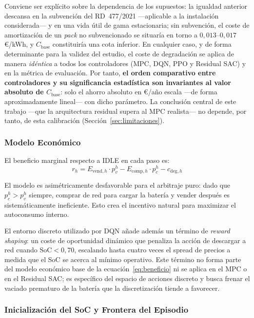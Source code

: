 \documentclass[12pt, a4paper, twoside]{report}
\begin{document}
Conviene ser explícito sobre la dependencia de los supuestos: la igualdad anterior
descansa en la subvención del RD~477/2021 —aplicable a la instalación
considerada— y en una vida útil de gama estacionaria; sin subvención, el coste de
amortización de un \emph{pack} no subvencionado se situaría en torno a
$0{,}013\text{--}0{,}017$\,€/kWh, y $C_{\text{base}}$ constituiría una cota
inferior. En cualquier caso, y de forma determinante para la validez del estudio,
el coste de degradación se aplica de manera \emph{idéntica} a todos los
controladores (MPC, DQN, PPO y Residual SAC) y en la métrica de evaluación. Por
tanto, \textbf{el orden comparativo entre controladores y su significancia
estadística son invariantes al valor absoluto de $C_{\text{base}}$}: solo el ahorro
absoluto en €/año escala —de forma aproximadamente lineal— con dicho parámetro. La
conclusión central de este trabajo —que la arquitectura residual supera al MPC
realista— no depende, por tanto, de esta calibración
(Sección~\ref{sec:limitaciones}).

\subsubsection{Modelo Económico}

El beneficio marginal respecto a IDLE en cada paso es:
\begin{equation}
  r_h = E_{\text{vend},h} \cdot p_v^h - E_{\text{comp},h} \cdot p_c^h
        - c_{\text{deg},h}
  \label{eq:beneficio}
\end{equation}

El modelo es asimétricamente desfavorable para el arbitraje puro: dado que
$p_c^h > p_v^h$ siempre, comprar de red para cargar la batería y vender
después es sistemáticamente ineficiente. Esto crea el incentivo natural para
maximizar el autoconsumo interno.

El entorno discreto utilizado por DQN añade además un término de
\textit{reward shaping}: un coste de oportunidad dinámico que penaliza la
acción de descargar a red cuando $\text{SoC} < 0{,}70$, escalando hasta cuatro
veces el spread de precios a medida que el SoC se acerca al mínimo operativo.
Este término no forma parte del modelo económico base de la
ecuación~\eqref{eq:beneficio} ni se aplica en el MPC o en el Residual SAC; es
específico del espacio de acciones discreto y busca frenar el vaciado
prematuro de la batería que la discretización tiende a favorecer.

\subsubsection{Inicialización del SoC y Frontera del Episodio}
\end{document}
